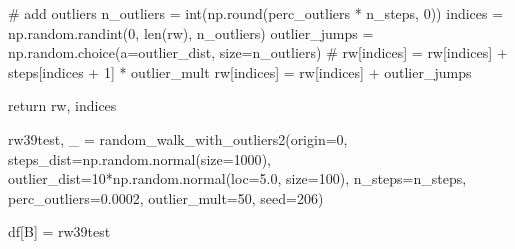 \documentclass[
  letterpaper,
  DIV=11,
  numbers=noendperiod,
  oneside]{scrreprt}
\newenvironment{Shaded}{\begin{snugshade}}{\end{snugshade}}
\newcommand{\BuiltInTok}[1]{\textcolor[rgb]{0.00,0.23,0.31}{#1}}
\newcommand{\CommentTok}[1]{\textcolor[rgb]{0.37,0.37,0.37}{#1}}
\newcommand{\ControlFlowTok}[1]{\textcolor[rgb]{0.00,0.23,0.31}{#1}}
\newcommand{\DecValTok}[1]{\textcolor[rgb]{0.68,0.00,0.00}{#1}}
\newcommand{\FloatTok}[1]{\textcolor[rgb]{0.68,0.00,0.00}{#1}}
\newcommand{\NormalTok}[1]{\textcolor[rgb]{0.00,0.23,0.31}{#1}}
\newcommand{\OperatorTok}[1]{\textcolor[rgb]{0.37,0.37,0.37}{#1}}
\newcommand{\StringTok}[1]{\textcolor[rgb]{0.13,0.47,0.30}{#1}}
\begin{document}
\begin{Shaded}
\begin{Highlighting}[]
    \CommentTok{\# add outliers}
\NormalTok{    n\_outliers }\OperatorTok{=} \BuiltInTok{int}\NormalTok{(np.}\BuiltInTok{round}\NormalTok{(perc\_outliers }\OperatorTok{*}\NormalTok{ n\_steps, }\DecValTok{0}\NormalTok{))}
\NormalTok{    indices }\OperatorTok{=}\NormalTok{ np.random.randint(}\DecValTok{0}\NormalTok{, }\BuiltInTok{len}\NormalTok{(rw), n\_outliers)}
\NormalTok{    outlier\_jumps }\OperatorTok{=}\NormalTok{ np.random.choice(a}\OperatorTok{=}\NormalTok{outlier\_dist, size}\OperatorTok{=}\NormalTok{n\_outliers)}
    \CommentTok{\# rw[indices] = rw[indices] + steps[indices + 1] * outlier\_mult}
\NormalTok{    rw[indices] }\OperatorTok{=}\NormalTok{ rw[indices] }\OperatorTok{+}\NormalTok{ outlier\_jumps}
    
    \ControlFlowTok{return}\NormalTok{ rw, indices}
\end{Highlighting}
\end{Shaded}

\begin{Shaded}
\begin{Highlighting}[]
\NormalTok{rw39test, \_ }\OperatorTok{=}\NormalTok{ random\_walk\_with\_outliers2(origin}\OperatorTok{=}\DecValTok{0}\NormalTok{,}
\NormalTok{                                       steps\_dist}\OperatorTok{=}\NormalTok{np.random.normal(size}\OperatorTok{=}\DecValTok{1000}\NormalTok{),}
\NormalTok{                                       outlier\_dist}\OperatorTok{=}\DecValTok{10}\OperatorTok{*}\NormalTok{np.random.normal(loc}\OperatorTok{=}\FloatTok{5.0}\NormalTok{, size}\OperatorTok{=}\DecValTok{100}\NormalTok{),}
\NormalTok{                                       n\_steps}\OperatorTok{=}\NormalTok{n\_steps,}
\NormalTok{                                       perc\_outliers}\OperatorTok{=}\FloatTok{0.0002}\NormalTok{,}
\NormalTok{                                       outlier\_mult}\OperatorTok{=}\DecValTok{50}\NormalTok{,}
\NormalTok{                                       seed}\OperatorTok{=}\DecValTok{206}\NormalTok{)}
\end{Highlighting}
\end{Shaded}

\begin{Shaded}
\begin{Highlighting}[]
\NormalTok{df[}\StringTok{\textquotesingle{}B\textquotesingle{}}\NormalTok{] }\OperatorTok{=}\NormalTok{ rw39test}
\end{Highlighting}
\end{Shaded}
\end{document}
